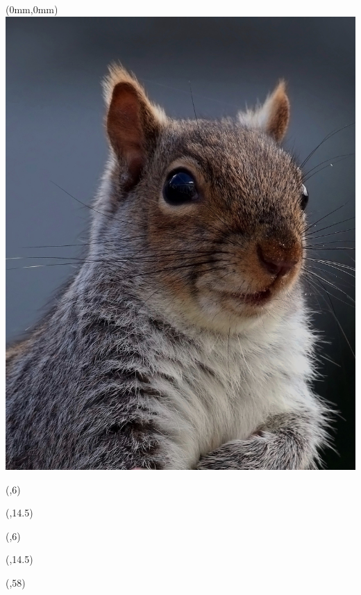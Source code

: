 \begin{textblock*}{\paperwidth}(0mm,0mm)
  \includegraphics[width=\paperwidth,%
                   keepaspectratio=true]{images/Sciurus_carolinensis}
\end{textblock*}

\begin{textblock*}{0.7\textwidth}(\TPHorizModule,6\TPVertModule)
  \textcolor{black!10}{\titlefmt}
\end{textblock*}

\begin{textblock*}{\textwidth}(\TPHorizModule,14.5\TPVertModule)
  \textcolor{black!10}{\authorsfmt}
\end{textblock*}

\null\cleardoublepage


\begin{textblock*}{0.7\textwidth}(\TPHorizModule,6\TPVertModule)
  \titlefmt
\end{textblock*}

\begin{textblock*}{\textwidth}(\TPHorizModule,14.5\TPVertModule)
  \affiliations
\end{textblock*}

\begin{textblock*}{\textwidth}(\TPHorizModule,58\TPVertModule)
  \edition
\end{textblock*}
\endgroup

